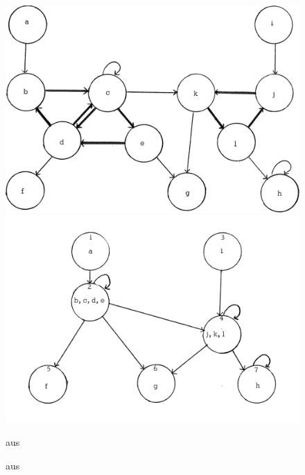\begin{figure}[H]
    \centering
    \includegraphics[width=.49\linewidth]{../img/purdom_g1.png}
    \includegraphics[width=.49\linewidth]{../img/purdom_g2b.png}
    \caption{aus \citep[Seite 78]{purdom1970transitive}}
\end{figure}

\newpage

\begin{figure}[H]
    \centering
    \setlength{\fboxsep}{10pt}\color{black!20}
    \normalcolor\caption{aus \citep[Seite 200]{jakobsson1991mixed}}
\end{figure}





